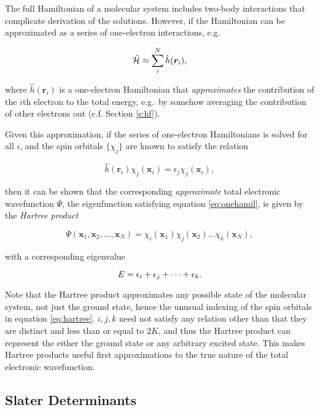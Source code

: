 The full Hamiltonian of a molecular system includes two-body interactions that
complicate derivation of the solutions. However, if the Hamiltonian can be
approximated as a series of one-electron interactions, e.g.

\begin{equation}
	\hat{\mathcal{H}} \approx \sum_i^N \hat h(\bm r_i) ,
	\label{eq:onehamil}
\end{equation}

\noindent where $\hat h(\bm r_i)$ is a one-electron Hamiltonian that
\emph{approximates} the contribution of the $i$th electron to the total energy,
e.g.\ by somehow averaging the contribution of other electrons out (c.f. Section
\ref{s:hf}).

Given this approximation, if the series of one-electron Hamiltonians is solved
for all $i$, and the spin orbitals $\{ \chi_j \}$ are known to satisfy the
relation

\begin{equation}
	\hat h(\bm r_i) \chi_j (\bm x_i) = \epsilon_j \chi_j(\bm x_i),
\end{equation}

\noindent then it can be shown that the corresponding \emph{approximate} total
electronic wavefunction $\Psi$, the eigenfunction satisfying equation
\ref{eq:onehamil}, is given by the \emph{Hartree product}

\begin{equation}
	\Psi(\bm x_1, \bm x_2, \dots, \bm x_N) = \chi_i(\bm x_1) \chi_j(\bm x_2) \dots \chi_k(\bm x_N),
	\label{eq:hartree}
\end{equation}

\noindent with a corresponding eigenvalue

\begin{equation}
	E = \epsilon_i + \epsilon_j + \cdots + \epsilon_k.
\end{equation}

Note that the Hartree product approximates any possible state of the molecular
system, not just the ground state, hence the unusual indexing of the spin
orbitals in equation \ref{eq:hartree}. $i, j, k$ need not satisfy any relation
other than that they are distinct and less than or equal to $2K$, and thus the
Hartree product can represent the either the ground state or any arbitrary
excited state. This makes Hartree products useful first approximations to the
true nature of the total electronic wavefunction.

\subsection{Slater Determinants}

